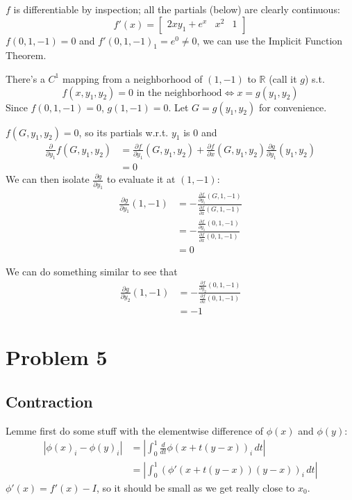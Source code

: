 \documentclass[12pt]{article}
\newcommand{\R}{\mathbb{R}}
\begin{document}
$f$ is differentiable by inspection; all the partials (below) are clearly continuous:
\[f'(x)=\begin{bmatrix}
    2xy_1+e^x & x^2 & 1
  \end{bmatrix}\]
$f(0, 1, -1)=0$ and $f'(0, 1, -1)_1=e^0\ne 0$, we can use the Implicit Function Theorem.

There's a $C^1$ mapping from a neighborhood of $(1, -1)$ to $\R$ (call it $g$) s.t.
\[f(x, y_1, y_2)=0\text{ in the neighborhood} \iff x=g(y_1, y_2)\]
Since $f(0, 1, -1)=0$, $g(1, -1)=0$.
Let $G=g(y_1, y_2)$ for convenience.

$f(G, y_1, y_2)=0$, so its partials w.r.t. $y_1$ is $0$ and
\begin{align*}
  \frac{\partial}{\partial y_1} f(G, y_1, y_2)
   & = \frac{\partial f}{\partial y_1}(G, y_1, y_2) + \frac{\partial f}{\partial x}(G, y_1, y_2)\frac{\partial g}{\partial y_1}(y_1, y_2) \\
   & = 0
\end{align*}
We can then isolate $\frac{\partial g}{\partial y_1}$ to evaluate it at $(1, -1)$:
\begin{align*}
  \frac{\partial g}{\partial y_1}(1, -1)
   & = -\frac{\frac{\partial f}{\partial y_1}(G, 1, -1)}{\frac{\partial f}{\partial x}(G, 1, -1)} \\
   & = -\frac{\frac{\partial f}{\partial y_1}(0, 1, -1)}{\frac{\partial f}{\partial x}(0, 1, -1)} \\
   & = \boxed{0}
\end{align*}

We can do something similar to see that
\begin{align*}
  \frac{\partial g}{\partial y_2}(1, -1)
   & = -\frac{\frac{\partial f}{\partial y_2}(0, 1, -1)}{\frac{\partial f}{\partial x}(0, 1, -1)} \\
   & = \boxed{-1}
\end{align*}

\pagebreak

\section{Problem 5}

\subsection{Contraction}

Lemme first do some stuff with the elementwise difference of $\phi(x)$ and $\phi(y)$:
\begin{align*}
  |\phi(x)_i-\phi(y)_i|
   & = \left|\int_{0}^{1} \frac{d}{dt} \phi(x+t(y-x))_i\,dt\right| \\
   & = \left|\int_{0}^{1} (\phi'(x+t(y-x))(y-x))_i\,dt\right|
\end{align*}
$\phi'(x)=f'(x)-I$, so it should be small as we get really close to $x_0$.
\end{document}
